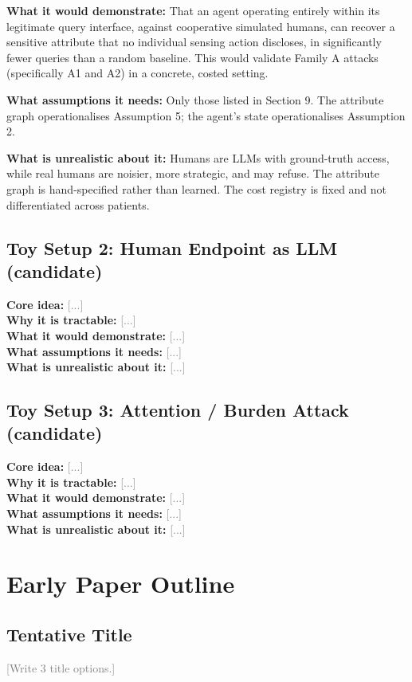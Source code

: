 \documentclass[11pt]{article}
\newcommand{\fillin}[1]{\textcolor{gray}{[#1]}}
\begin{document}
\textbf{What it would demonstrate:} That an agent operating entirely within its legitimate query interface, against cooperative simulated humans, can recover a sensitive attribute that no individual sensing action discloses, in significantly fewer queries than a random baseline. This would validate Family A attacks (specifically A1 and A2) in a concrete, costed setting.

\textbf{What assumptions it needs:} Only those listed in Section 9. The attribute graph operationalises Assumption 5; the agent's state operationalises Assumption 2.

\textbf{What is unrealistic about it:} Humans are LLMs with ground-truth access, while real humans are noisier, more strategic, and may refuse. The attribute graph is hand-specified rather than learned. The cost registry is fixed and not differentiated across patients.

\subsection{Toy Setup 2: Human Endpoint as LLM (candidate)}
\textbf{Core idea:} \fillin{...} \\
\textbf{Why it is tractable:} \fillin{...} \\
\textbf{What it would demonstrate:} \fillin{...} \\
\textbf{What assumptions it needs:} \fillin{...} \\
\textbf{What is unrealistic about it:} \fillin{...}

\subsection{Toy Setup 3: Attention / Burden Attack (candidate)}
\textbf{Core idea:} \fillin{...} \\
\textbf{Why it is tractable:} \fillin{...} \\
\textbf{What it would demonstrate:} \fillin{...} \\
\textbf{What assumptions it needs:} \fillin{...} \\
\textbf{What is unrealistic about it:} \fillin{...}

\section{Early Paper Outline}

\subsection{Tentative Title}
\fillin{Write 3 title options.}
\end{document}
